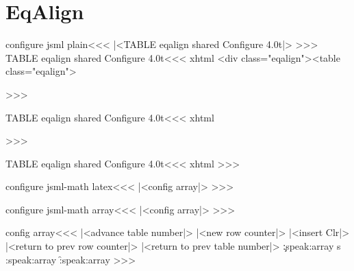 {%
\section{EqAlign}

\<configure jsml plain\><<<
|<TABLE eqalign shared Configure 4.0t|>
>>>
\<TABLE eqalign shared Configure 4.0t\><<<
   {\:xhtml{\IgnorePar\EndP}\HCode
      {<div class="eqalign"><table class="eqalign">}}
   {}
   {}{\IgnorePar{}}
   {}
   {}
\def\:eqalign:{\Configure{noalign}
  {\HCode{<tr><td class="noalign" colspan="2">}}%
  {\HCode{</td></tr>}}}

>>>





\<TABLE eqalign shared Configure 4.0t\><<<
   {\:xhtml{\IgnorePar\EndP}}
   {}
   {}{\IgnorePar{}}
   {}
   {}
\def\:eqalignno:{\Configure{noalign}
  {\HCode{<tr><td class="noalign" colspan="2">}}%
  {\HCode{</td></tr>}}}

>>>

\<TABLE eqalign shared Configure 4.0t\><<<
   {\:xhtml{\IgnorePar\EndP}}
   {}
   {}{\IgnorePar{}}
   {}
   {}
\def\:leqalignno:{\Configure{noalign}
  {\HCode{<tr><td class="noalign" colspan="2">}}%
  {\HCode{</td></tr>}}}
>>>



\<configure jsml-math latex\><<<
|<config array|>
>>>

\<configure jsml-math array\><<<
|<config array|>
>>>


\<config array\><<<
   {|<advance table number|>%
    |<new row counter|>%
    }
   {%
    \ifvmode \IgnorePar\fi
    |<insert Clr|>%
    |<return to prev row counter|>%
    |<return to prev table number|>}
   {\c:speak:array}%
   {\xdef\hrow:s{\HRow}}%
   {%
    \e:speak:array}
   {\f:speak:array
    }
   {\bgroup\Configure{$}{}{}{}} 
   {\egroup}
   {}{}
>>>






}
